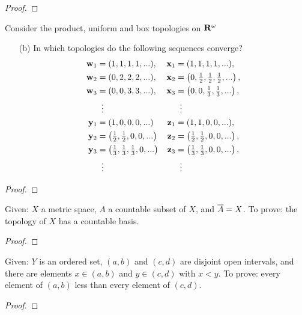 \begin{proof}

\end{proof}
\newpage
\begin{problem}[Munkres \S20, p.\,127, \#4(b)]
Consider the product, uniform and box topologies on $\mathbf{R}^\omega$
\begin{enumerate}[noitemsep]
\item[(b)] In which topologies do the following sequences converge?
\begin{align*}
\mathbf{w}_1&=(1,1,1,1,...),&\mathbf{x}_1&=(1,1,1,1,...),\\
\mathbf{w}_2&=(0,2,2,2,...),&\mathbf{x}_2&=\left(0,\tfrac{1}{2},\tfrac{1}{2},\tfrac{1}{2},...\right),\\
\mathbf{w}_3&=(0,0,3,3,...),&\mathbf{x}_3&=\left(0,0,\tfrac{1}{3},\tfrac{1}{3},...\right),\\
&\vdotswithin{=}&&\vdotswithin{=}\\
\mathbf{y}_1&=(1,0,0,0,...)&\mathbf{z}_1&=(1,1,0,0,...),\\
\mathbf{y}_2&=\left(\tfrac{1}{2},\tfrac{1}{2},0,0,...\right)&\mathbf{z}_2&=\left(\tfrac{1}{2},\tfrac{1}{2},0,0,...\right),\\
\mathbf{y}_3&=\left(\tfrac{1}{3},\tfrac{1}{3},\tfrac{1}{3},0,...\right)&\mathbf{z}_3&=\left(\tfrac{1}{3},\tfrac{1}{3},0,0,...\right),\\
&\vdotswithin{=}&&\vdotswithin{=}
\end{align*}
\end{enumerate}
\end{problem}
\begin{proof}
\end{proof}
\newpage
\begin{problem}[A]
Given: $X$ a metric space, $A$ a countable subset of $X$, and
$\overline{A}=X$. To prove: the topology of $X$ has a countable
basis.
\end{problem}
\begin{proof}
\end{proof}
\newpage
\begin{problem}[B]
Given: $Y$ is an ordered set, $(a,b)$ and $(c,d)$ are disjoint
open intervals, and there are elements $x\in(a,b)$ and
$y\in(c,d)$ with $x<y$. To prove: every element of $(a,b)$ less
than every element of $(c,d)$.
\end{problem}
\begin{proof}
\end{proof}
\newpage
